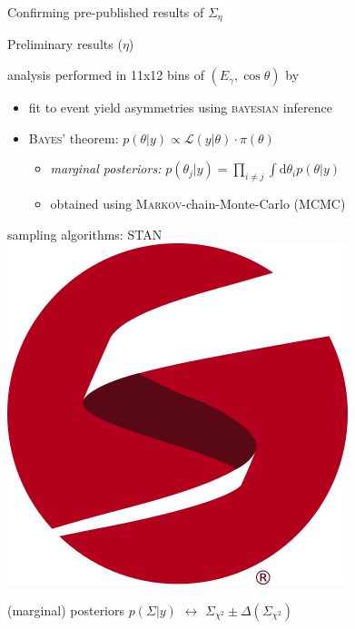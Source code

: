 \documentclass[11pt,aspectratio=169,dvipsnames]{beamer}
\newcommand{\thecolor}{black!70!blue}
\begin{document}
\begin{frame}{Confirming pre-published results of $\Sigma_\eta$}
	
\end{frame}

\begin{frame}{Preliminary results ($\eta$)}
	\begin{minipage}{\linewidth}
\begin{tcolorbox}[colback=blue!5,colframe=\thecolor,title={Event selection ($\eta$)}]
	analysis performed in 11x12 bins of $(E_\gamma,\cos\theta)$ by \cites{eta}
\end{tcolorbox}
	\end{minipage}
	\begin{minipage}{\linewidth}
\begin{tcolorbox}[colback=blue!5,colframe=\thecolor,title={Method}]
	\begin{itemize}
		\item fit to event yield asymmetries using \textsc{bayesian} inference
		\item \textsc{Bayes'} theorem: $p(\theta|y)\propto\mathcal{L}(y|\theta)\cdot\pi(\theta)$
		\begin{itemize}
			\item \emph{marginal posteriors:} $p(\theta_j|y)=\prod_{i\neq j}\int\text{d}\theta_i p(\theta|y)$
			\item obtained using \textsc{Markov}-chain-Monte-Carlo (MCMC)

		\end{itemize} 
	\end{itemize}
\begin{flushright}
	sampling algorithms: STAN \includegraphics[width=.1\linewidth]{figs/logo-tm.png}\\
	\cites{stan}
\end{flushright}
\end{tcolorbox}
(marginal) posteriors $p(\Sigma|y)$ $\leftrightarrow$ $\Sigma_{\chi^2}\pm\Delta(\Sigma_{\chi^2})$
\end{minipage}
	

\end{frame}
\end{document}
